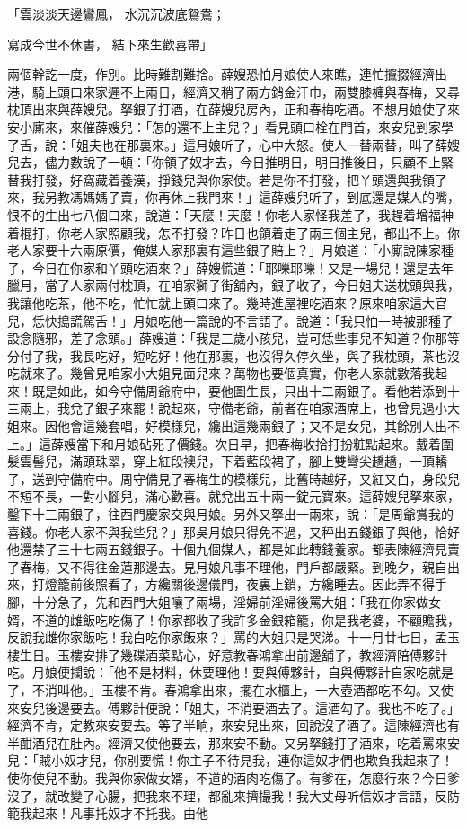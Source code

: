 \begin{showcontents}{}
「雲淡淡天邊鸞鳳，  水沉沉波底鴛鴦；

寫成今世不休書，  結下來生歡喜帶」

兩個幹訖一度，作別。比時難割難捨。薛嫂恐怕月娘使人來瞧，連忙攛掇經濟出港，騎上頭口來家遲不上兩日，經濟又稍了兩方銷金汗巾，兩雙膝褲與春梅，又尋枕頂出來與薛嫂兒。拏銀子打酒，在薛嫂兒房內，正和春梅吃酒。不想月娘使了來安小廝來，來催薛嫂兒：「怎的還不上主兒？」看見頭口栓在門首，來安兒到家學了舌，說：「姐夫也在那裏來。」這月娘听了，心中大怒。使人一替兩替，叫了薛嫂兒去，儘力數說了一頓：「你領了奴才去，今日推明日，明日推後日，只顧不上緊替我打發，好窩藏着養漢，掙錢兒與你家使。若是你不打發，把丫頭還與我領了來，我另教馮媽媽子賣，你再休上我門來！」這薛嫂兒听了，到底還是媒人的嘴，恨不的生出七八個口來，說道：「天麼！天麼！你老人家怪我差了，我趕着增福神着棍打，你老人家照顧我，怎不打發？昨日也領着走了兩三個主兒，都出不上。你老人家要十六兩原價，俺媒人家那裏有這些銀子賠上？」月娘道：「小廝說陳家種子，今日在你家和丫頭吃酒來？」薛嫂慌道：「耶嚛耶嚛！又是一場兒！還是去年臘月，當了人家兩付枕頂，在咱家獅子街舖內，銀子收了，今日姐夫送枕頭與我，我讓他吃茶，他不吃，忙忙就上頭口來了。幾時進屋裡吃酒來？原來咱家這大官兒，恁快搗謊駕舌！」月娘吃他一篇說的不言語了。說道：「我只怕一時被那種子設念隨邪，差了念頭。」薛嫂道：「我是三歲小孩兒，豈可恁些事兒不知道？你那等分付了我，我長吃好，短吃好！他在那裏，也沒得久停久坐，與了我枕頭，茶也沒吃就來了。幾曾見咱家小大姐見面兒來？萬物也要個真實，你老人家就數落我起來！既是如此，如今守備周爺府中，要他圖生長，只出十二兩銀子。看他若添到十三兩上，我兌了銀子來罷！說起來，守備老爺，前者在咱家酒席上，也曾見過小大姐來。因他會這幾套唱，好模樣兒，纔出這幾兩銀子；又不是女兒，其餘別人出不上。」這薛嫂當下和月娘砧死了價錢。次日早，把春梅收拾打扮粧點起來。戴着圍髮雲髻兒，滿頭珠翠，穿上紅段襖兒，下着藍段裙子，腳上雙彎尖趫趫，一頂轎子，送到守備府中。周守備見了春梅生的模樣兒，比舊時越好，又紅又白，身段兒不短不長，一對小腳兒，滿心歡喜。就兌出五十兩一錠元寶來。這薛嫂兒拏來家，鑿下十三兩銀子，往西門慶家交與月娘。另外又拏出一兩來，說：「是周爺賞我的喜錢。你老人家不與我些兒？」那吳月娘只得免不過，又秤出五錢銀子與他，恰好他還禁了三十七兩五錢銀子。十個九個媒人，都是如此轉錢養家。都表陳經濟見賣了春梅，又不得往金蓮那邊去。見月娘凡事不理他，門戶都嚴緊。到晚夕，親自出來，打燈籠前後照看了，方纔關後邊儀門，夜裏上鎖，方纔睡去。因此弄不得手腳，十分急了，先和西門大姐嚷了兩場，淫婦前淫婦後罵大姐：「我在你家做女婿，不道的雌飯吃吃傷了！你家都收了我許多金銀箱籠，你是我老婆，不顧贍我，反說我雌你家飯吃！我白吃你家飯來？」罵的大姐只是哭涕。十一月廿七日，孟玉樓生日。玉樓安排了幾碟酒菜點心，好意教春鴻拿出前邊舖子，教經濟陪傅夥計吃。月娘便攔說：「他不是材料，休要理他！要與傅夥計，自與傅夥計自家吃就是了，不消叫他。」玉樓不肯。春鴻拿出來，擺在水櫃上，一大壺酒都吃不勾。又使來安兒後邊要去。傅夥計便說：「姐夫，不消要酒去了。這酒勾了。我也不吃了。」經濟不肯，定教來安要去。等了半晌，來安兒出來，回說沒了酒了。這陳經濟也有半酣酒兒在肚內。經濟又使他要去，那來安不動。又另拏錢打了酒來，吃着罵來安兒：「賊小奴才兒，你別要慌！你主子不待見我，連你這奴才們也欺負我起來了！使你使兒不動。我與你家做女婿，不道的酒肉吃傷了。有爹在，怎麼行來？今日爹沒了，就改變了心腸，把我來不理，都亂來擠撮我！我大丈母听信奴才言語，反防範我起來！凡事托奴才不托我。由他
\end{showcontents}
